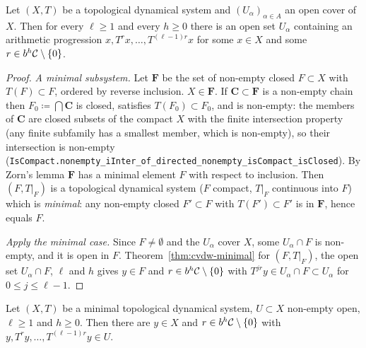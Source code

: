 \begin{theorem}
  \label{thm:cvdw}
  \leanok
  Let $(X,T)$ be a topological dynamical system and $(U_\alpha)_{\alpha \in A}$ an open cover of
  $X$.  Then for every $\ell \geq 1$ and every $h \geq 0$ there is an open set $U_\alpha$
  containing an arithmetic progression $x, T^r x, \dots, T^{(\ell-1)r}x$ for some $x \in X$ and
  some $r \in b^h\mathcal{C} \setminus \{0\}$.
\end{theorem}

\begin{proof}
  \emph{A minimal subsystem.}  Let $\mathbf F$ be the set of non-empty closed $F \subset X$ with
  $T(F) \subset F$, ordered by reverse inclusion.  $X \in \mathbf F$.  If $\mathbf C \subset \mathbf F$
  is a non-empty chain then $F_0 \coloneqq \bigcap\mathbf C$ is closed, satisfies
  $T(F_0) \subset F_0$, and is non-empty: the members of $\mathbf C$ are closed subsets of the
  compact $X$ with the finite intersection property (any finite subfamily has a smallest
  member, which is non-empty), so their intersection is non-empty
  (\texttt{IsCompact.nonempty\_iInter\_of\_directed\_nonempty\_isCompact\_isClosed}).  By Zorn's
  lemma $\mathbf F$ has a minimal element $F$ with respect to inclusion.  Then $(F,T|_F)$ is a
  topological dynamical system ($F$ compact, $T|_F$ continuous into $F$) which is \emph{minimal}:
  any non-empty closed $F' \subset F$ with $T(F') \subset F'$ is in $\mathbf F$, hence equals $F$.

  \emph{Apply the minimal case.}  Since $F \neq \emptyset$ and the $U_\alpha$ cover $X$, some
  $U_\alpha \cap F$ is non-empty, and it is open in $F$.  Theorem~\ref{thm:cvdw-minimal} for
  $(F,T|_F)$, the open set $U_\alpha \cap F$, $\ell$ and $h$ gives $y \in F$ and
  $r \in b^h\mathcal{C}\setminus\{0\}$ with $T^{jr}y \in U_\alpha \cap F \subset U_\alpha$ for
  $0 \leq j \leq \ell - 1$.
\end{proof}

\begin{theorem}
  \label{thm:cvdw-minimal}
  \leanok
  Let $(X,T)$ be a minimal topological dynamical system, $U \subset X$ non-empty open,
  $\ell \geq 1$ and $h \geq 0$.  Then there are $y \in X$ and $r \in b^h\mathcal{C}\setminus\{0\}$
  with $y, T^r y, \dots, T^{(\ell-1)r}y \in U$.
\end{theorem}

